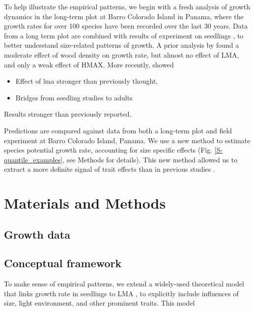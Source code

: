 \documentclass[12pt, a4paper]{article}
\begin{document}
To help illustrate the empirical patterns, we begin with a fresh analysis of
growth dynamics in the long-term plot at Barro Colorado Island in Panama,
where the growth rates for over 100 species have been recorded over the last
30 years. Data from a long term plot \citep{condit-2012} are combined
with results of experiment on seedlings \citep{kitajima-2013}, to better understand
size-related patterns of growth. A prior analysis by
 \citet{wright-2010} found a moderate effect of wood density on
growth rate, but almost no effect of LMA, and only a weak effect of HMAX. More recently,
 \citet{ruger-2012} showed

\begin{itemize}
\itemsep1pt\parskip0pt
\item
  Effect of lma stronger than previously thought,
\item
  Bridges from seedling studies to adults
\end{itemize}

Results stronger than previously reported.

Predictions
are compared against data from both a long-term
plot \citep{condit-2012} and field
experiment \citep{kitajima-2013} at Barro Colorado Island, Panama.
We use a new method to estimate species potential growth rate,
accounting for size specific effects (Fig. \ref{S-quantile_examples},
see Methods for details). This new method allowed us to extract a more
definite signal of trait effects than in previous
studies \citep{wright-2010}.

\section{Materials and Methods}\label{materials-and-methods}

\subsection{Growth data}\label{growth-data}


\subsection{Conceptual framework}\label{conceptual-framework}

To make sense of empirical patterns, we extend a widely-used theoretical model that links growth rate in
seedlings to LMA \citep{lambers-1992, wright_cross-2000}, to explicitly include influences of
size, light environment, and other prominent traits. This model
\end{document}
